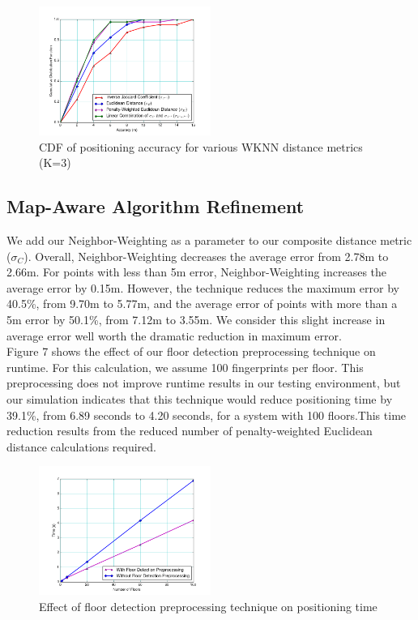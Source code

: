 \documentclass[conference]{IEEEtran}
\begin{document}
\begin{figure}[h!]
  \centering
    \includegraphics[width=0.5\textwidth]{distance_comparison.png}
    \caption{CDF of positioning accuracy for various WKNN distance metrics (K=3)}
\end{figure}


\subsection{Map-Aware Algorithm Refinement}

We add our Neighbor-Weighting as a parameter to our composite distance metric ($\sigma_C$). Overall, Neighbor-Weighting decreases the average error from 2.78m to 2.66m. For points with less than 5m error, Neighbor-Weighting increases the average error by 0.15m. However, the technique reduces the maximum error by 40.5\%, from 9.70m to 5.77m, and the average error of points with more than a 5m error by 50.1\%, from 7.12m to 3.55m. We consider this slight increase in average error well worth the dramatic reduction in maximum error.\\		
\indent Figure 7 shows the effect of our floor detection preprocessing technique on runtime. For this calculation, we assume 100 fingerprints per floor. This preprocessing does not improve runtime results in our testing environment, but our simulation indicates that this technique would reduce positioning time by 39.1\%, from 6.89 seconds to 4.20 seconds, for a system with 100 floors.This time reduction results from the reduced number of penalty-weighted Euclidean distance calculations required.

\begin{figure}[h!]
  \centering
    \includegraphics[width=0.5\textwidth]{time_comparison.png}
   \caption{Effect of floor detection preprocessing technique on positioning time}
\end{figure}
\end{document}
